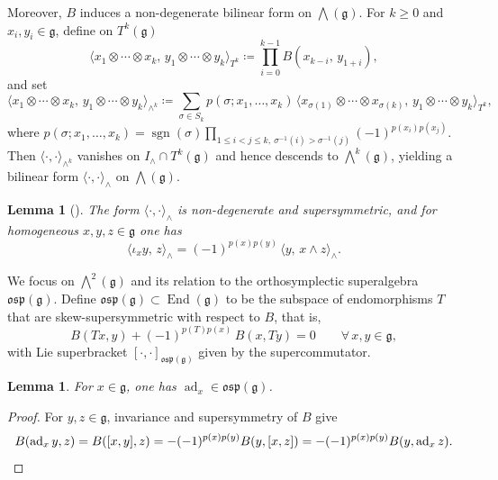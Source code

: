\documentclass[11pt]{amsart}
\newcommand{\sgn}{\operatorname{sgn}}
\newcommand{\End}{\operatorname{End}}
\newcommand{\ad}{\operatorname{ad}}
\def\osp{{\mathfrak{osp}}}
\def\gg{{\mathfrak{g}}}
\theoremstyle{plain}
\newtheorem{lemma}[theorem]{Lemma}
\theoremstyle{remark}
\theoremstyle{definition}
\numberwithin{equation}{section}
\theoremstyle{remark}
\begin{document}
Moreover, $B$ induces a non-degenerate bilinear form on $\bigwedge(\gg)$. For $k\ge 0$ and $x_i,y_i\in\gg$, define on $T^{k}(\gg)$
\begin{equation}
\langle x_{1}\otimes\cdots\otimes x_{k},\, y_{1}\otimes\cdots\otimes y_{k}\rangle_{T^{k}}
\coloneqq \prod_{i=0}^{k-1} B(x_{k-i},\, y_{1+i}),
\end{equation}
and set
\begin{equation}
\langle x_{1}\otimes\cdots\otimes x_{k},\, y_{1}\otimes\cdots\otimes y_{k}\rangle_{\wedge^{k}}
\coloneqq \sum_{\sigma\in S_{k}} p(\sigma;x_{1},\ldots,x_{k})\,
\langle x_{\sigma(1)}\otimes\cdots\otimes x_{\sigma(k)},\, y_{1}\otimes\cdots\otimes y_{k}\rangle_{T^{k}},
\end{equation}
where $p(\sigma; x_{1},\ldots, x_{k})=\sgn(\sigma)\prod_{1 \leq i < j \leq k, \ \sigma^{-1}(i) > \sigma^{-1}(j)} (-1)^{p(x_{i})p(x_{j})}$.
Then $\langle\cdot,\cdot\rangle_{\wedge^{k}}$ vanishes on $I_{\wedge}\cap T^{k}(\gg)$ and hence descends to $\bigwedge^{\!k}(\gg)$,
yielding a bilinear form $\langle\cdot,\cdot\rangle_{\wedge}$ on $\bigwedge(\gg)$.

\begin{lemma}[{\cite[Section~5]{generalized_Clifford}}]
The form $\langle\cdot,\cdot\rangle_{\wedge}$ is non-degenerate and supersymmetric, and for homogeneous $x,y,z\in\gg$ one has
\[
\langle \iota_{x} y,\, z \rangle_{\wedge}
=(-1)^{p(x)p(y)}\, \langle y,\, x\wedge z\rangle_{\wedge}.
\]
\end{lemma}

We focus on $\bigwedge^{2}(\gg)$ and its relation to the orthosymplectic superalgebra $\osp(\gg)$. Define $\osp(\gg)\subset\End(\gg)$ to be the subspace of endomorphisms $T$ that are skew-supersymmetric with respect to $B$, that is,
\begin{equation}
B(Tx,y)+(-1)^{p(T)p(x)}\,B(x,Ty)=0 \qquad \forall\,x,y\in\gg,
\end{equation}
with Lie superbracket $[\cdot,\cdot]_{\osp(\gg)}$ given by the supercommutator.

\begin{lemma} \label{lemm::ad_x_is_orthosymplectic}
For $x\in\gg$, one has $\ad_{x}\in\osp(\gg)$.
\end{lemma}

\begin{proof}
For $y,z\in\gg$, invariance and supersymmetry of $B$ give
\[
B(\ad_{x}y,z)=B([x,y],z)=-(-1)^{p(x)p(y)}B(y,[x,z])=-(-1)^{p(x)p(y)}B(y,\ad_{x}z). \qedhere
\]
\end{proof}
\end{document}
